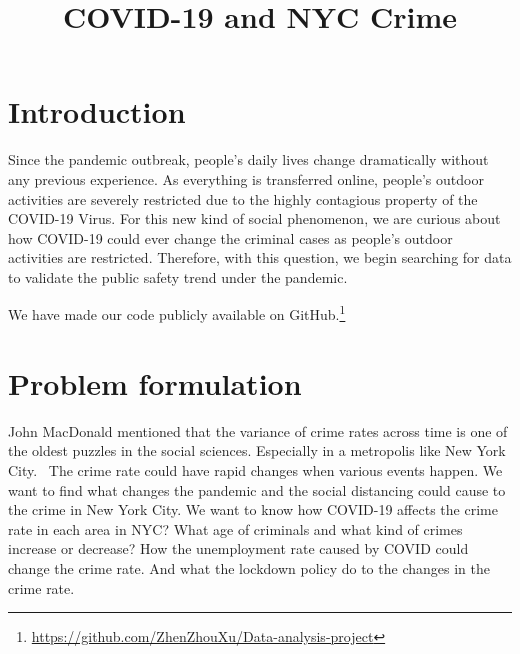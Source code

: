 \documentclass[conference]{IEEEtran}
\begin{document}
\title{COVID-19 and NYC Crime}

\author{
\and
{}
\and
{}
}

\maketitle


\section{Introduction}
Since the pandemic outbreak, people's daily lives change dramatically without any previous experience. As everything is transferred online, people's outdoor activities are severely restricted due to the highly contagious property of the COVID-19 Virus. For this new kind of social phenomenon, we are curious about how COVID-19 could ever change the criminal cases as people's outdoor activities are restricted. Therefore, with this question, we begin searching for data to validate the public safety trend under the pandemic.

We have made our code publicly available on GitHub.\footnote{\url{https://github.com/ZhenZhouXu/Data-analysis-project}}


\section{Problem formulation}
John MacDonald mentioned that the variance of crime rates across time is one of the oldest puzzles in the social sciences. Especially in a metropolis like New York City.~\cite{mac2020TheEffe} The crime rate could have rapid changes when various events happen. We want to find what changes the pandemic and the social distancing could cause to the crime in New York City. We want to know how COVID-19 affects the crime rate in each area in NYC? What age of criminals and what kind of crimes increase or decrease? How the unemployment rate caused by COVID could change the crime rate. And what the lockdown policy do to the changes in the crime rate.
\end{document}

